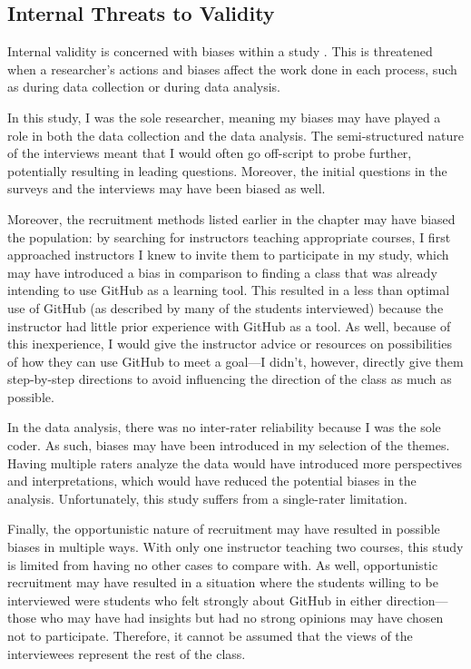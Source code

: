 \subsection{Internal Threats to Validity}
Internal validity is concerned with biases within a study \cite{creswell2013research}. This is threatened when a researcher's actions and biases affect the work done in each process, such as during data collection or during data analysis.

In this study, I was the sole researcher, meaning my biases may have played a role in both the data collection and the data analysis. The semi-structured nature of the interviews meant that I would often go off-script to probe further, potentially resulting in leading questions. Moreover, the initial questions in the surveys and the interviews may have been biased as well.

Moreover, the recruitment methods listed earlier in the chapter may have biased the population: by searching for instructors teaching appropriate courses, I first approached instructors I knew to invite them to participate in my study, which may have introduced a bias in comparison to finding a class that was already intending to use GitHub as a learning tool. This resulted in a less than optimal use of GitHub (as described by many of the students interviewed) because the instructor had little prior experience with GitHub as a tool. As well, because of this inexperience, I would give the instructor advice or resources on possibilities of how they can use GitHub to meet a goal---I didn't, however, directly give them step-by-step directions to avoid influencing the direction of the class as much as possible.

In the data analysis, there was no inter-rater reliability because I was the sole coder. As such, biases may have been introduced in my selection of the themes. Having multiple raters analyze the data would have introduced more perspectives and interpretations, which would have reduced the potential biases in the analysis. Unfortunately, this study suffers from a single-rater limitation.

Finally, the opportunistic nature of recruitment may have resulted in possible biases in multiple ways. With only one instructor teaching two courses, this study is limited from having no other cases to compare with. As well, opportunistic recruitment may have resulted in a situation where the students willing to be interviewed were students who felt strongly about GitHub in either direction---those who may have had insights but had no strong opinions may have chosen not to participate. Therefore, it cannot be assumed that the views of the interviewees represent the rest of the class.

